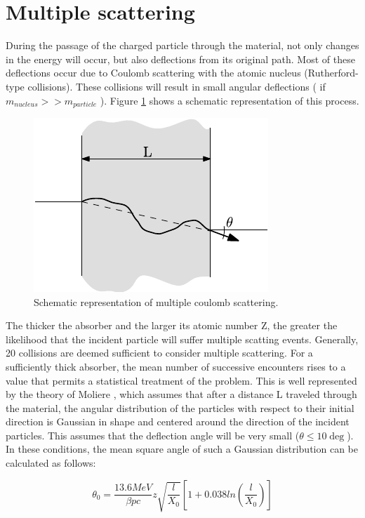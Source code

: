 \section{Multiple scattering}

During the passage of the charged particle through the material, not only changes in the energy will occur, but also deflections from its original path. Most of these deflections occur due to Coulomb scattering with the atomic nucleus (Rutherford-type collisions). These collisions will result in small angular deflections ( if $m_{nucleus} >> m_{particle}$ ). Figure \ref{fig:PartScattering} shows a schematic representation of this process. 

\begin{figure}[h]
    \centering
    \includegraphics[width=0.4\columnwidth]{MultipleCoulombScat/MultipleScat.pdf}
    \caption{Schematic representation of multiple coulomb scattering.}
    \label{fig:PartScattering}
\end{figure}


The thicker the absorber and the larger its atomic number Z, the greater the likelihood that the incident particle will suffer multiple scatting events. Generally, 20 collisions are deemed sufficient to consider multiple scattering. For a sufficiently thick absorber, the mean number of successive encounters rises to a value that permits a statistical treatment of the problem. This is well represented by the theory of Moliere \parencite*[][]{ref:Moliere}, which assumes that after a distance L traveled through the material, the angular distribution of the particles with respect to their initial direction is Gaussian in shape and centered around the direction of the incident particles. This assumes that the deflection angle will be very small ($\theta \leq 10 \deg $). In these conditions, the mean square angle of such a Gaussian distribution can be calculated as follows: 


\begin{equation}
    \theta_0 = \frac{13.6 MeV}{\beta p c} z \sqrt{\frac{l}{X_0}}\left[ 1+0.038ln\left(\frac{l}{X_0}\right)\right] 
    \label{eq:multscat}
\end{equation}


